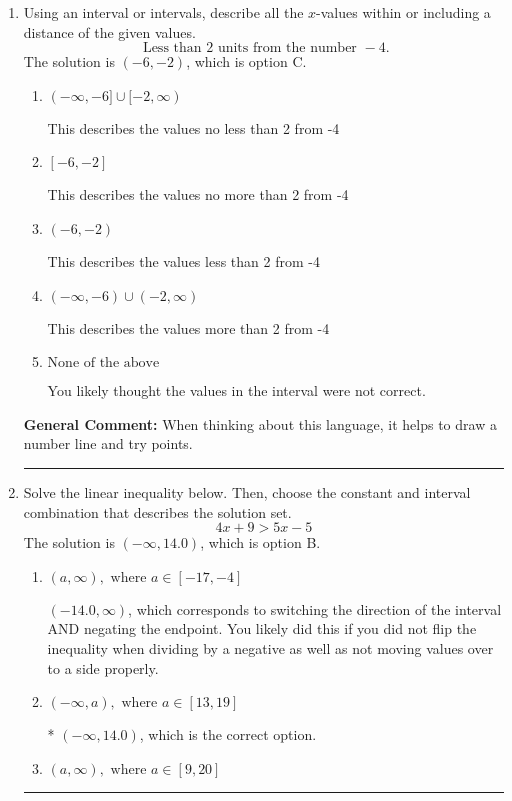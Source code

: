 \documentclass{extbook}[14pt]
\newcommand{\litem}[1]{\item #1

\rule{\textwidth}{0.4pt}}
\begin{document}
\begin{enumerate}
{\begin{enumerate}[label=\Alph*.]
* This is correct as the answer should be $(-5.00, 7.00]$.
\end{enumerate}

\textbf{General Comment:} To solve, you will need to break up the compound inequality into two inequalities. Be sure to keep track of the inequality! It may be best to draw a number line and graph your solution.
}
\litem{
Using an interval or intervals, describe all the $x$-values within or including a distance of the given values.
\[ \text{ Less than } 2 \text{ units from the number } -4. \]The solution is \( (-6, -2) \), which is option C.\begin{enumerate}[label=\Alph*.]
\item \( (-\infty, -6] \cup [-2, \infty) \)

This describes the values no less than 2 from -4
\item \( [-6, -2] \)

This describes the values no more than 2 from -4
\item \( (-6, -2) \)

This describes the values less than 2 from -4
\item \( (-\infty, -6) \cup (-2, \infty) \)

This describes the values more than 2 from -4
\item \( \text{None of the above} \)

You likely thought the values in the interval were not correct.
\end{enumerate}

\textbf{General Comment:} When thinking about this language, it helps to draw a number line and try points.
}
\litem{
Solve the linear inequality below. Then, choose the constant and interval combination that describes the solution set.
\[ 4x + 9 > 5x -5 \]The solution is \( (-\infty, 14.0) \), which is option B.\begin{enumerate}[label=\Alph*.]
\item \( (a, \infty), \text{ where } a \in [-17, -4] \)

 $(-14.0, \infty)$, which corresponds to switching the direction of the interval AND negating the endpoint. You likely did this if you did not flip the inequality when dividing by a negative as well as not moving values over to a side properly.
\item \( (-\infty, a), \text{ where } a \in [13, 19] \)

* $(-\infty, 14.0)$, which is the correct option.
\item \( (a, \infty), \text{ where } a \in [9, 20] \)


\end{enumerate}}
\end{enumerate}
\end{document}
